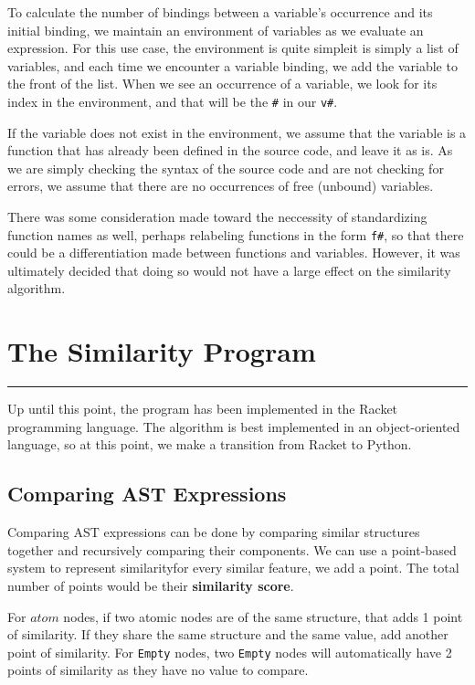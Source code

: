 \documentclass[12pt]{article}
\newcommand{\itm}[1]{\ensuremath{\mathit{#1}}}
\newcommand{\key}[1]{\texttt{#1}}
\newcommand{\Atm}[0]{\itm{atom}}
\newcommand{\usection}[1]{\section{#1}\hrule\hfill}
\begin{document}
\hfill

To calculate the number of bindings between a variable's occurrence and its initial binding, we maintain an environment of variables as we evaluate an expression. For this use case, the environment is quite simple\textemdash it is simply a list of variables, and each time we encounter a variable binding, we add the variable to the front of the list. When we see an occurrence of a variable, we look for its index in the environment, and that will be the \key{\#} in our \key{v\#}.

\hfill

If the variable does not exist in the environment, we assume that the variable is a function that has already been defined in the source code, and leave it as is. As we are simply checking the syntax of the source code and are not checking for errors, we assume that there are no occurrences of free (unbound) variables.

\hfill

There was some consideration made toward the neccessity of standardizing function names as well, perhaps relabeling functions in the form \key{f\#}, so that there could be a differentiation made between functions and variables. However, it was ultimately decided that doing so would not have a large effect on the similarity algorithm.

\usection{The Similarity Program}

Up until this point, the program has been implemented in the Racket programming language. The algorithm is best implemented in an object-oriented language, so at this point, we make a transition from Racket to Python.

\subsection{Comparing AST Expressions}

Comparing AST expressions can be done by comparing similar structures together and recursively comparing their components. We can use a point-based system to represent similarity\textemdash for every similar feature, we add a point. The total number of points would be their \textbf{similarity score}.

\hfill

For \Atm{} nodes, if two atomic nodes are of the same structure, that adds 1 point of similarity. If they share the same structure and the same value, add another point of similarity. For \key{Empty} nodes, two \key{Empty} nodes will automatically have 2 points of similarity as they have no value to compare.
\end{document}
